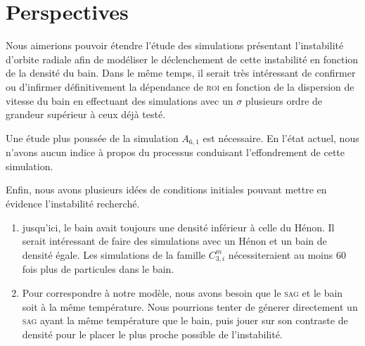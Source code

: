 \documentclass[a4paper,11pt,twoside,openright]{report}
\renewcommand{\(}{\ensuremath{\left(}}
\renewcommand{\)}{\ensuremath{\right)}}
\begin{document}




		\section{Perspectives}

			Nous aimerions pouvoir étendre l'étude des simulations présentant l'instabilité d'orbite radiale afin de modéliser le
			déclenchement de cette instabilité en fonction de la densité du bain. Dans le même temps, il serait très intéressant de
			confirmer ou d'infirmer définitivement la dépendance de \textsc{roi} en fonction de la dispersion de vitesse du bain en effectuant des
			simulations avec un $\sigma$ plusieurs ordre de grandeur supérieur à ceux déjà testé.

			Une étude plus poussée de la simulation $A_{6,1}$ est nécessaire. En l'état actuel, nous n'avons aucun indice à propos du processus
			conduisant l'effondrement de cette simulation.

			Enfin, nous avons plusieurs idées de conditions initiales pouvant mettre en évidence l'instabilité recherché.
			\begin{enumerate}
				\item jusqu'ici, le bain avait toujours une densité inférieur à celle du Hénon. Il serait intéressant de faire des
					simulations avec un Hénon et un bain de densité égale. Les simulations de la famille $C^m_{3,i}$ nécessiteraient au moins $60$ fois plus
					de particules dans le bain.



				\item Pour correspondre à notre modèle, nous avons besoin que le \textsc{sag} et le bain soit à la même température.
					Nous pourrions tenter de génerer directement un \textsc{sag} ayant la même température que le bain, puis jouer
					sur son contraste de densité pour le placer le plus proche possible de l'instabilité.

			\end{enumerate}
\end{document}

